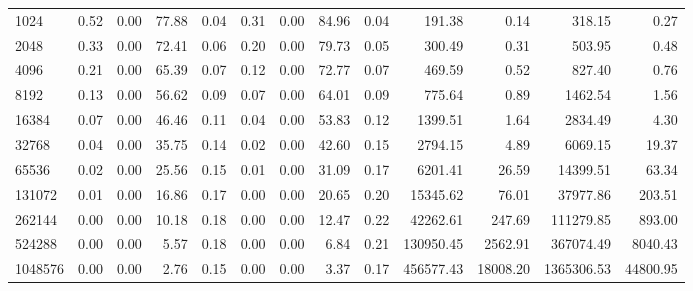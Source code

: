 \begin{tabular}{lrrrrrrrrrrrr}
1024     &        0.52 &        0.00 &         77.88 &          0.04 &           0.31 &           0.00 &        84.96 &         0.04 &           191.38 &             0.14 &          318.15 &            0.27 \\
2048     &        0.33 &        0.00 &         72.41 &          0.06 &           0.20 &           0.00 &        79.73 &         0.05 &           300.49 &             0.31 &          503.95 &            0.48 \\
4096     &        0.21 &        0.00 &         65.39 &          0.07 &           0.12 &           0.00 &        72.77 &         0.07 &           469.59 &             0.52 &          827.40 &            0.76 \\
8192     &        0.13 &        0.00 &         56.62 &          0.09 &           0.07 &           0.00 &        64.01 &         0.09 &           775.64 &             0.89 &         1462.54 &            1.56 \\
16384    &        0.07 &        0.00 &         46.46 &          0.11 &           0.04 &           0.00 &        53.83 &         0.12 &          1399.51 &             1.64 &         2834.49 &            4.30 \\
32768    &        0.04 &        0.00 &         35.75 &          0.14 &           0.02 &           0.00 &        42.60 &         0.15 &          2794.15 &             4.89 &         6069.15 &           19.37 \\
65536    &        0.02 &        0.00 &         25.56 &          0.15 &           0.01 &           0.00 &        31.09 &         0.17 &          6201.41 &            26.59 &        14399.51 &           63.34 \\
131072   &        0.01 &        0.00 &         16.86 &          0.17 &           0.00 &           0.00 &        20.65 &         0.20 &         15345.62 &            76.01 &        37977.86 &          203.51 \\
262144   &        0.00 &        0.00 &         10.18 &          0.18 &           0.00 &           0.00 &        12.47 &         0.22 &         42262.61 &           247.69 &       111279.85 &          893.00 \\
524288   &        0.00 &        0.00 &          5.57 &          0.18 &           0.00 &           0.00 &         6.84 &         0.21 &        130950.45 &          2562.91 &       367074.49 &         8040.43 \\
1048576  &        0.00 &        0.00 &          2.76 &          0.15 &           0.00 &           0.00 &         3.37 &         0.17 &        456577.43 &         18008.20 &      1365306.53 &        44800.95 \\

\end{tabular}
